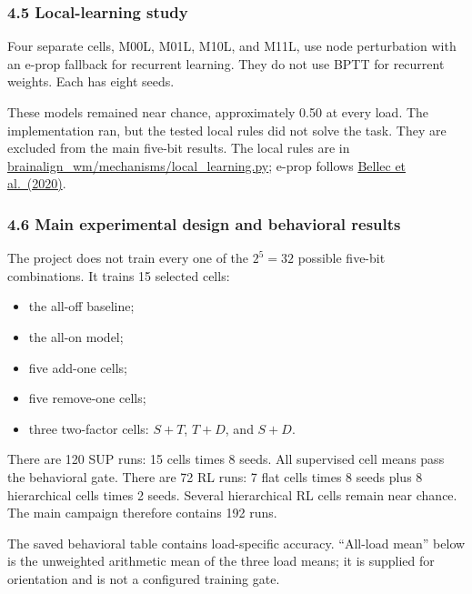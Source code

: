 \documentclass[
  10pt,
]{article}
\providecommand{\tightlist}{%
  \setlength{\itemsep}{0pt}\setlength{\parskip}{0pt}}
\begin{document}
\hypertarget{local-learning-study}{%
\subsubsection{4.5 Local-learning study}\label{local-learning-study}}

Four separate cells, M00L, M01L, M10L, and M11L, use node perturbation
with an e-prop fallback for recurrent learning. They do not use BPTT for
recurrent weights. Each has eight seeds.

These models remained near chance, approximately 0.50 at every load. The
implementation ran, but the tested local rules did not solve the task.
They are excluded from the main five-bit results. The local rules are in
\url{brainalign_wm/mechanisms/local_learning.py}; e-prop follows
\href{https://doi.org/10.1038/s41467-020-17236-y}{Bellec et al.~(2020)}.

\hypertarget{main-experimental-design-and-behavioral-results}{%
\subsubsection{4.6 Main experimental design and behavioral
results}\label{main-experimental-design-and-behavioral-results}}

The project does not train every one of the \(2^5=32\) possible five-bit
combinations. It trains 15 selected cells:

\begin{itemize}
\tightlist
\item
  the all-off baseline;
\item
  the all-on model;
\item
  five add-one cells;
\item
  five remove-one cells;
\item
  three two-factor cells: \(S+T\), \(T+D\), and \(S+D\).
\end{itemize}

There are 120 SUP runs: 15 cells times 8 seeds. All supervised cell
means pass the behavioral gate. There are 72 RL runs: 7 flat cells times
8 seeds plus 8 hierarchical cells times 2 seeds. Several hierarchical RL
cells remain near chance. The main campaign therefore contains 192 runs.

The saved behavioral table contains load-specific accuracy. ``All-load
mean'' below is the unweighted arithmetic mean of the three load means;
it is supplied for orientation and is not a configured training gate.
\end{document}
